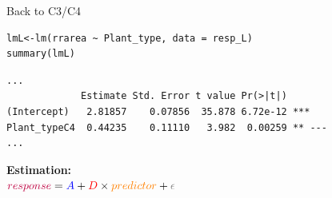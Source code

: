 \documentclass[10pt]{beamer}
\makeatletter
\newenvironment{kframe}{%
 \def\at@end@of@kframe{}%
 \ifinner\ifhmode%
  \def\at@end@of@kframe{\end{minipage}}%
  \begin{minipage}{\columnwidth}%
 \fi\fi%
 \def\FrameCommand##1{\hskip\@totalleftmargin \hskip-\fboxsep
 \colorbox{shadecolor}{##1}\hskip-\fboxsep
     \hskip-\linewidth \hskip-\@totalleftmargin \hskip\columnwidth}%
 \MakeFramed {\advance\hsize-\width
   \@totalleftmargin\z@ \linewidth\hsize
   \@setminipage}}%
 {\par\unskip\endMakeFramed%
 \at@end@of@kframe}
\newenvironment{knitrout}{}{} %
\makeatother
\begin{document}
\begin{frame}[fragile]{Back to C3/C4}
\begin{knitrout}
\color{fgcolor}\begin{kframe}
\begin{verbatim}
lmL<-lm(rrarea ~ Plant_type, data = resp_L)
summary(lmL)
\end{verbatim}
\end{kframe}
\end{knitrout}

\vspace{-0.15cm}
\pause
\begin{knitrout}
\color{fgcolor}\begin{kframe}
\footnotesize
\begin{verbatim}
...
             Estimate Std. Error t value Pr(>|t|)    
(Intercept)   2.81857    0.07856  35.878 6.72e-12 ***
Plant_typeC4  0.44235    0.11110   3.982  0.00259 ** ---
...
\end{verbatim}
\end{kframe}
\end{knitrout}

\textbf{Estimation:\\}
${\color{purple}{response}} = {\color{blue}{A}} + {\color{red}{D}} \times {\color{orange}{predictor}} + {\color{gray}{\epsilon}}$\\


\vspace{0.2cm}

\end{frame}
\end{document}
